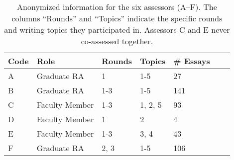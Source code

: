 \begin{table}[]
    \centering
    \small
    \begin{tabular}{lllllll}
    \toprule
    Code & Role & Rounds & Topics & \# Essays \\
    
    \midrule
    A & Graduate RA & 1 & 1-5  &  27 \\
    B & Graduate RA &  1-3 & 1-5 &   141  \\
    C & Faculty Member & 1-3 & 1, 2, 5 &  93 \\
    D & Faculty Member & 1 & 2 &  4 \\
    E & Faculty Member & 1-3 & 3, 4 &  43 \\
    F & Graduate RA & 2, 3 & 1-5 & 106  \\
    \bottomrule
    \end{tabular}
    
    \caption{Anonymized information for the six assessors (A–F). The columns ``Rounds'' and ``Topics'' indicate the specific rounds and writing topics they participated in. Assessors C and E never co-assessed together.}
    \label{tab:feedbackRate}
\end{table}




    
    

